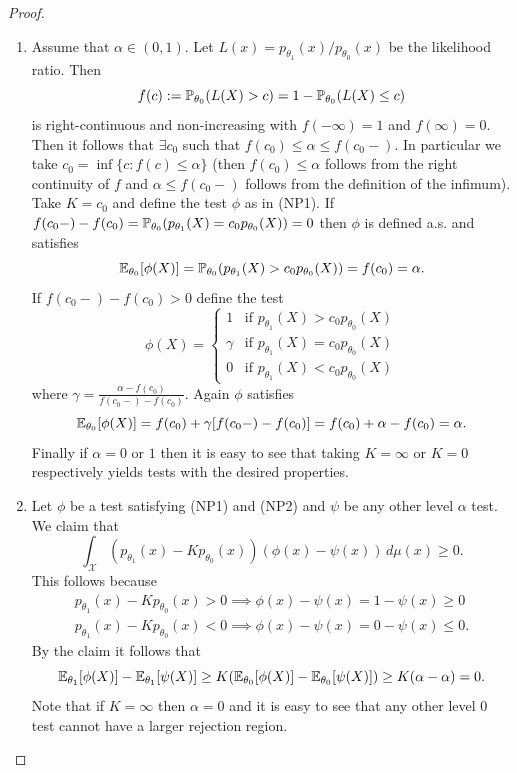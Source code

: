 \begin{proof}
	\phantom{}
	\begin{enumerate}
		\item[(i)] Assume that $\alpha \in (0, 1)$. Let $L(x) = p_{\theta_1}(x) / p_{\theta_0}(x)$ be the likelihood ratio. Then \[
		f(c) := \mathbb{P}_{\theta_0}(L(X) > c) = 1 - \mathbb{P}_{\theta_0}(L(X) \le c)
		\] is right-continuous and non-increasing with $f(-\infty) = 1$ and $f(\infty) = 0$. Then it follows that $\exists c_0$ such that $f(c_0) \leq \alpha  \leq f(c_{0}-)$. In particular we take $c_0 = \inf\{c : f(c) \leq \alpha\}$ (then $f(c_0) \leq \alpha$ follows from the right continuity of $f$ and $\alpha  \leq f(c_{0}-)$ follows from the definition of the infimum). Take $K = c_0$ and define the test $\phi$ as in (NP1). If $f(c_0-) - f(c_0) = \mathbb{P}_{\theta_0}(p_{\theta_1}(X) = c_0 p_{\theta_0}(X)) = 0$ then $\phi$ is defined a.s. and satisfies \[
			\mathbb{E}_{\theta_0}[\phi(X)] = \mathbb{P}_{\theta_0}(p_{\theta_1}(X) > c_0 p_{\theta_0}(X)) = f(c_0) = \alpha.
		\] If $f(c_0-) - f(c_0) > 0$ define the test \[
		 \phi(X) = \begin{cases}
			1 &\text{if } p_{\theta_1}(X) > c_0p_{\theta_0}(X) \\
			\gamma &\text{if } p_{\theta_1}(X) = c_0p_{\theta_0}(X) \\
			0 &\text{if } p_{\theta_1}(X) < c_0p_{\theta_0}(X) 
		\end{cases}
		\] where $\gamma = \frac{\alpha - f(c_0)}{f(c_0-) - f(c_0)}$. Again $\phi$ satisfies \[
			\mathbb{E}_{\theta_0}[\phi(X)]  = f(c_0) + \gamma [f(c_0-) - f(c_0)] = f(c_0) + \alpha - f(c_0) = \alpha.
		\] Finally if $\alpha = 0$ or $1$ then it is easy to see that taking $K = \infty$ or $K = 0$ respectively yields tests with the desired properties.
		
		\item[(ii)] Let $\phi$ be a test satisfying (NP1) and (NP2) and $\psi$ be any other level $\alpha$ test. We claim that 
		\[
			\int_{\mathcal X} (p_{\theta_1}(x) - K p_{\theta_0}(x))(\phi(x) - \psi(x)) \, d\mu(x) \geq 0.
		\] This follows because \begin{align*}
				p_{\theta_1}(x) - K p_{\theta_0}(x) > 0 \implies \phi(x) - \psi(x) = 1 - \psi(x) \ge 0\phantom{.} \\
				p_{\theta_1}(x) - K p_{\theta_0}(x) < 0 \implies \phi(x) - \psi(x) = 0 - \psi(x) \le 0.
		\end{align*}
		By the claim it follows that \[
			\mathbb{E}_{\theta_1}[\phi(X)] - \mathbb{E}_{\theta_1}[\psi(X)] \geq K (	\mathbb{E}_{\theta_0}[\phi(X)] - \mathbb{E}_{\theta_0}[\psi(X)] ) \geq K(\alpha - \alpha) = 0.
		\] Note that if $K = \infty$ then $\alpha = 0$ and it is easy to see that any other level $0$ test cannot have a larger rejection region.
	 	

\end{enumerate}
\end{proof}
